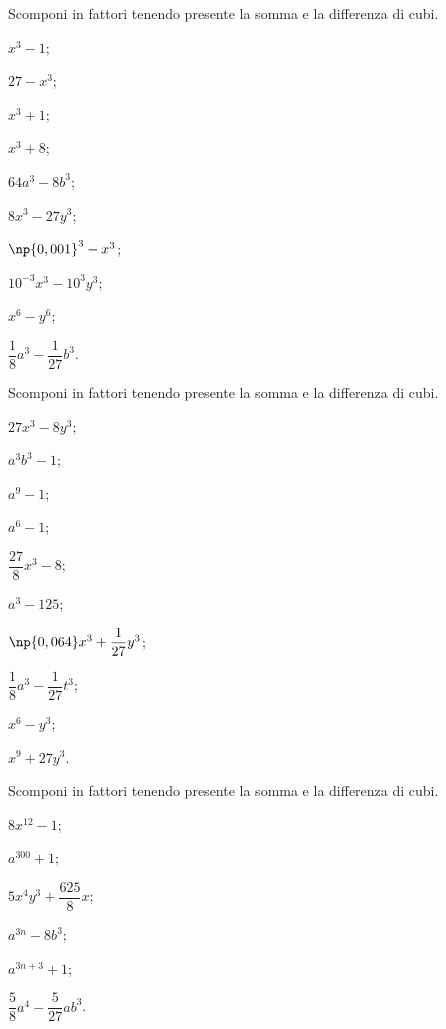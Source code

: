 \begin{esercizio}
\label{ese:17.16}
 Scomponi in fattori tenendo presente la somma e la differenza di cubi.
 \begin{multicols}{2}
 \begin{enumeratea}
  \item $x^{3}-1$;
\item $27-x^{3}$;
\item $x^{3}+1$;
\item $x^{3}+8$;
\item $64a^{3}-8b^{3}$;
\item $8x^{3}-27y^{3}$;
\item $\np{0,001}^{3}-x^{3}$;
\item $10^{-3}x^{3}-10^{3}y^{3}$;
\item $x^{6}-y^{6}$;
\item $\dfrac{1}{8}a^{3}-\dfrac{1}{27}b^{3}$.
 \end{enumeratea}
 \end{multicols}
\end{esercizio}

\begin{esercizio}
\label{ese:17.17}
 Scomponi in fattori tenendo presente la somma e la differenza di cubi.
 \begin{multicols}{2}
 \begin{enumeratea}
  \item $27x^{3}-8y^{3}$;
 \item $a^{3}b^{3}-1$;
 \item $a^{9}-1$;
 \item $a^{6}-1$;
 \item $\dfrac{27}{8}x^{3}-8$;
 \item $a^{3}-125$;
 \item $\np{0,064}x^{3}+\dfrac{1}{27}y^{3}$;
 \item $\dfrac{1}{8}a^{3}-\dfrac{1}{27}t^{3}$;
 \item $x^{6}-y^{3}$;
 \item $x^{9}+27y^{3}$.
 \end{enumeratea}
 \end{multicols}
\end{esercizio}

\begin{esercizio}
\label{ese:17.18}
 Scomponi in fattori tenendo presente la somma e la differenza di cubi.
 \begin{multicols}{2}
 \begin{enumeratea}
 \item $8x^{12}-1$;
 \item $a^{300}+1$;
\item $5x^{4}y^{3}+\dfrac{625}{8}x$;
 \item $a^{3n}-8b^{3}$;
 \item $a^{3n+3}+1$;
 \item $\dfrac{5}{8}a^{4}-\dfrac{5}{27}ab^{3}$.
 \end{enumeratea}
 \end{multicols}
\end{esercizio}

